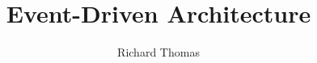 \documentclass{csse4400}
\title{Event-Driven Architecture}
\author{Richard Thomas}
\date{\week{6}}
\begin{document}
\makecover



%
%
\end{document}
